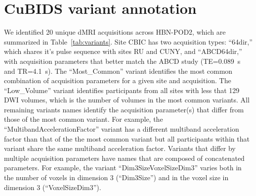 \documentclass[fleqn,10pt,inline]{wlscirep}
\begin{document}
\appendix
\begin{appendixbox}
\label{app:variants}
\section*{CuBIDS variant annotation}

We identified 20 unique dMRI acquisitions across HBN-POD2, which are summarized in Table~\ref{tab:variants}. Site CBIC has two acquisition types: ``64dir,'' which shares it's pulse sequence with sites RU and CUNY, and ``ABCD64dir,'' with acquisition parameters that better match the ABCD study (TE=\qty{0.089}{\second} and TR=\qty{4.1}{\second}). The ``Most\_Common'' variant identifies the most common combination of acquisition parameters for a given site and acquisition. The ``Low\_Volume'' variant identifies participants from all sites with less that 129 DWI volumes, which is the number of volumes in the most common variants. All remaining variants names identify the acquisition parameter(s) that differ from those of the most common variant. For example, the ``MultibandAccelerationFactor'' variant has a different multiband acceleration factor than that of the the most common variant but all participants within that variant share the same multiband acceleration factor. Variants that differ by multiple acquisition parameters have names that are composed of concatenated parameters. For example, the variant ``Dim3SizeVoxelSizeDim3'' varies both in the number of voxels in dimension 3 (``Dim3Size'') and in the voxel size in dimension 3 (``VoxelSizeDim3'').


\end{appendixbox}
\end{document}
